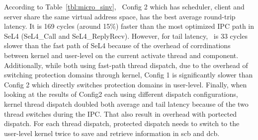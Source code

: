 
According to Table~\ref{tbl:micro_sinv}, \name\ Config 2 which has scheduler, client and server share the same virtual address space, has the best average round-trip latency.
It is 169 cycles (around 15\%) faster than the most optimized IPC path in SeL4 (SeL4\_Call and SeL4\_ReplyRecv).
However, for tail latency, \name\ is 33 cycles slower than the fast path of SeL4 because of the overhead of corrdinations between kernel and user-level on the current activate thread and component.
Additionally, while both using fast-path thread dispatch, due to the overhead of switching protection domains through kernel, Config 1 is significantly slower than Config 2 which directly switches protection domains in user-level.
Finally, when looking at the results of Config2 each using different dispatch configurations, kernel thread dispatch doubled both average and tail latency because of the two thread switches during the IPC.
That also result in overhead with portected dispatch.
For each thread dispatch, protected dispatch needs to switch to the user-level kernel twice to save and retrieve information in scb and dcb.


